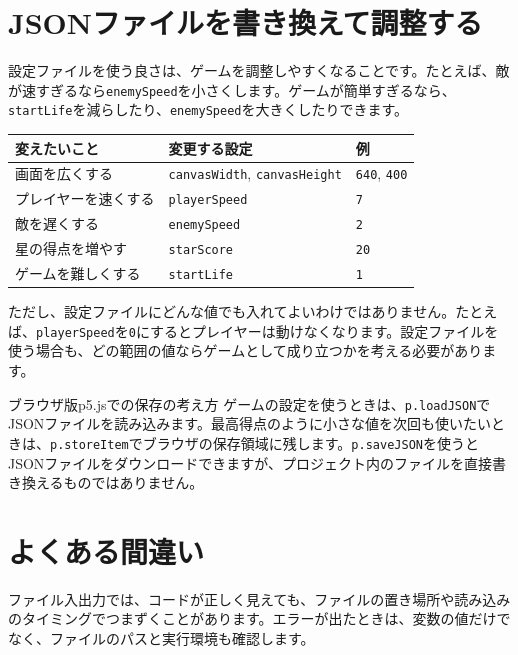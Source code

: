 \section{JSONファイルを書き換えて調整する}

設定ファイルを使う良さは、ゲームを調整しやすくなることです。たとえば、敵が速すぎるなら\texttt{enemySpeed}を小さくします。ゲームが簡単すぎるなら、\texttt{startLife}を減らしたり、\texttt{enemySpeed}を大きくしたりできます。

\begin{center}
\begin{tabular}{lll}
\toprule
変えたいこと & 変更する設定 & 例 \\
\midrule
画面を広くする & \texttt{canvasWidth}, \texttt{canvasHeight} & \texttt{640}, \texttt{400} \\
プレイヤーを速くする & \texttt{playerSpeed} & \texttt{7} \\
敵を遅くする & \texttt{enemySpeed} & \texttt{2} \\
星の得点を増やす & \texttt{starScore} & \texttt{20} \\
ゲームを難しくする & \texttt{startLife} & \texttt{1} \\
\bottomrule
\end{tabular}
\end{center}

ただし、設定ファイルにどんな値でも入れてよいわけではありません。たとえば、\texttt{playerSpeed}を\texttt{0}にするとプレイヤーは動けなくなります。設定ファイルを使う場合も、どの範囲の値ならゲームとして成り立つかを考える必要があります。

\begin{pointbox}{ブラウザ版p5.jsでの保存の考え方}
ゲームの設定を使うときは、\texttt{p.loadJSON}でJSONファイルを読み込みます。最高得点のように小さな値を次回も使いたいときは、\texttt{p.storeItem}でブラウザの保存領域に残します。\texttt{p.saveJSON}を使うとJSONファイルをダウンロードできますが、プロジェクト内のファイルを直接書き換えるものではありません。
\end{pointbox}

\section{よくある間違い}

ファイル入出力では、コードが正しく見えても、ファイルの置き場所や読み込みのタイミングでつまずくことがあります。エラーが出たときは、変数の値だけでなく、ファイルのパスと実行環境も確認します。

